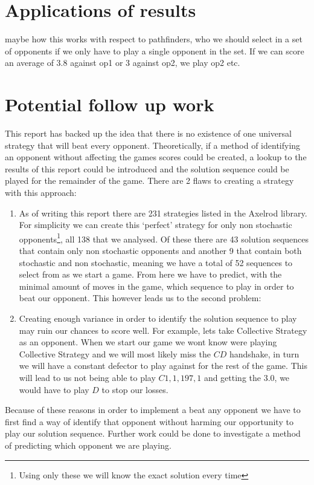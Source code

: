 \section{Applications of results}
maybe how this works with respect to pathfinders, who we should select in a set of opponents if we only have to play a single opponent in the set.
If we can score an average of 3.8 against op1 or 3 against op2, we play op2 etc.



\section{Potential follow up work}\label{sec:follow_up}
This report has backed up the idea that there is no existence of one universal strategy that will beat every opponent.
Theoretically, if a method of identifying an opponent without affecting the games scores could be created, a lookup to the results of this report could be introduced and the solution sequence could be played for the remainder of the game.
There are 2 flaws to creating a strategy with this approach:
\begin{enumerate}
    \item {As of writing this report there are 231 strategies listed in the Axelrod library.
    For simplicity we can create this `perfect' strategy for only non stochastic opponents\footnote{Using only these we will know the exact solution every time}, all 138 that we analysed.
    Of these there are 43 solution sequences that contain only non stochastic opponents and another 9 that contain both stochastic and non stochastic, meaning we have a total of 52 sequences to select from as we start a game.
    From here we have to predict, with the minimal amount of moves in the game, which sequence to play in order to beat our opponent.
    This however leads us to the second problem:}

    \item {Creating enough variance in order to identify the solution sequence to play may  ruin our chances to score well.
    For example, lets take Collective Strategy as an opponent.
    When we start our game we wont know were playing Collective Strategy and we will most likely miss the $CD$ handshake, in turn we will have a constant defector to play against for the rest of the game.
    This will lead to us not being able to play $C1,1,197,1$ and getting the $3.0$, we would have to play $D$ to stop our losses.}
\end{enumerate}

Because of these reasons in order to implement a beat any opponent we have to first find a way of identify that opponent without harming our opportunity to play our solution sequence. 
Further work could be done to investigate a method of predicting which opponent we are playing.